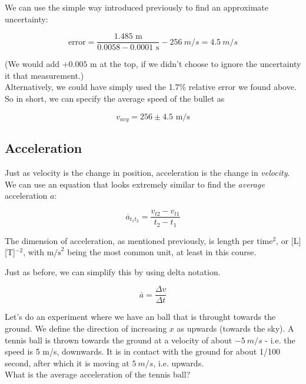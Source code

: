 We can use the simple way introduced previously to find an approximate uncertainty:

\begin{equation}
\text{error} = \frac{1.485 \text{ m}}{0.0058 - 0.0001 \text{ s}} - \SI{256}{m/s} = \SI{4.5}{m/s}
\end{equation}

(We would add $+0.005$ m at the top, if we didn't choose to ignore the uncertainty it that measurement.)\\
Alternatively, we could have simply used the 1.7\% relative error we found above.\\
So in short, we can specify the average speed of the bullet as

\begin{equation}
v_{avg} = 256 \pm 4.5 \text{ m/s}
\end{equation}

\subsection{Acceleration}

Just as velocity is the change in position, acceleration is the change in \emph{velocity}. We can use an equation that looks extremely similar to find the \emph{average} acceleration $a$:

\begingroup
\large
\begin{equation}
 \overbar{a}_{t_1 t_2} = \frac{v_{t2} - v_{t1}}{t_2 - t_1}
\end{equation}
\endgroup

The dimension of acceleration, as mentioned previously, is length per time${}^2$, or [L] [T]${}^{-2}$, with $\text{m/s}^2$ being the most common unit, at least in this course.

Just as before, we can simplify this by using delta notation.

\begin{equation}
\overbar{a} = \frac{\Delta v}{\Delta t}
\end{equation}

Let's do an experiment where we have an ball that is throught towards the ground.
We define the direction of increasing $x$ as upwards (towards the sky). A tennis ball is thrown towards the ground at a velocity of about $\SI{-5}{m/s}$ - i.e. the speed is 5 m/s, downwards. It is in contact with the ground for about 1/100 second, after which it is moving at $\SI{+5}{m/s}$, i.e. upwards.\\
What is the average acceleration of the tennis ball?

